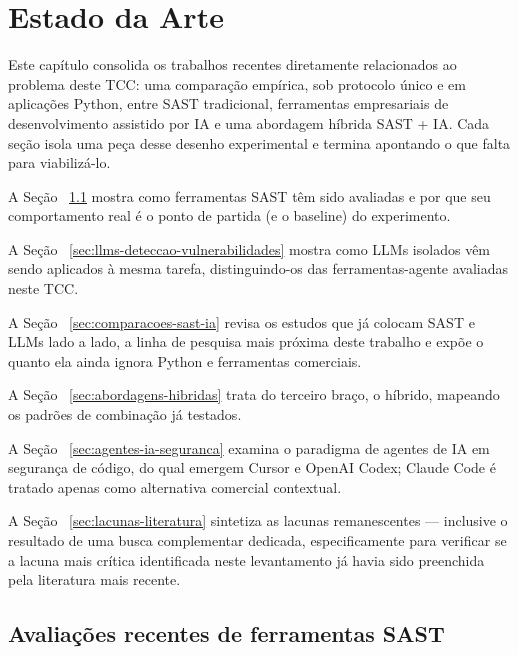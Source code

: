 \chapter{Estado da Arte}\label{cap:estadoarte}

Este capítulo consolida os trabalhos recentes diretamente relacionados ao problema deste TCC: uma comparação empírica, sob protocolo único e em aplicações Python, entre SAST tradicional, ferramentas empresariais de desenvolvimento assistido por IA e uma abordagem híbrida SAST + IA. Cada seção isola uma peça desse desenho experimental e termina apontando o que falta para viabilizá-lo. 

A Seção ~\ref{sec:avaliacoes-sast} mostra como ferramentas SAST têm sido avaliadas e por que seu comportamento real é o ponto de partida (e o baseline) do experimento. 

A Seção ~\ref{sec:llms-deteccao-vulnerabilidades} mostra como LLMs isolados vêm sendo aplicados à mesma tarefa, distinguindo-os das ferramentas-agente avaliadas neste TCC. 

A Seção ~\ref{sec:comparacoes-sast-ia} revisa os estudos que já colocam SAST e LLMs lado a lado, a linha de pesquisa mais próxima deste trabalho  e expõe o quanto ela ainda ignora Python e ferramentas comerciais. 

A Seção ~\ref{sec:abordagens-hibridas}  trata do terceiro braço, o híbrido, mapeando os padrões de combinação já testados. 

A Seção ~\ref{sec:agentes-ia-seguranca} examina o paradigma de agentes de IA em segurança de código, do qual emergem Cursor e OpenAI Codex; Claude Code é tratado apenas como alternativa comercial contextual. 

A Seção ~\ref{sec:lacunas-literatura} sintetiza as lacunas remanescentes — inclusive o resultado de uma busca complementar dedicada, especificamente para verificar se a lacuna mais crítica identificada neste levantamento já havia sido preenchida pela literatura mais recente.


\section{Avaliações recentes de ferramentas SAST}\label{sec:avaliacoes-sast}


